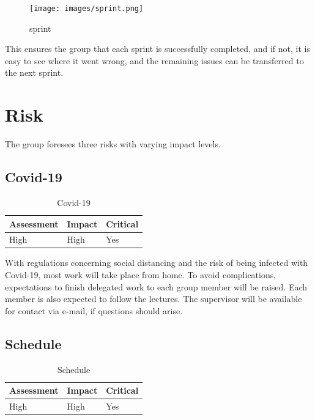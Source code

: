\begin{figure}[H]
\centering 
\texttt{[image: images/sprint.png]}
\label{figure:sprint}
\caption{sprint} 
\end{figure}

This ensures the group that each sprint is successfully completed, and if not,
it is easy to see where it went wrong, and the remaining issues can be
transferred to the next sprint.

\section{Risk}
The group foresees three risks with varying impact levels.

\subsection{Covid-19}
\begin{table}[ht]
    \begin{tabularx}{\textwidth}{|>{\RaggedRight}X|>{\RaggedRight}X|>{\RaggedRight}X|}
        \hline
        \textbf{Assessment} & \textbf{Impact} & \textbf{Critical} \\
        \hline
        High & High & Yes \\
        \hline
    \end{tabularx}
    \caption{Covid-19} 
    \label{table:Covid-19}
\end{table} 


With regulations concerning social distancing and the risk of being infected
with Covid-19, most work will take place from home. To avoid complications,
expectations to finish delegated work to each group member will be raised. Each
member is also expected to follow the lectures. The supervisor will be available
for contact via e-mail, if questions should arise.

\subsection{Schedule}
\begin{table}[ht]
    \begin{tabularx}{\textwidth}{|>{\RaggedRight}X|>{\RaggedRight}X|>{\RaggedRight}X|}
        \hline
        \textbf{Assessment} & \textbf{Impact} & \textbf{Critical} \\
        \hline
        High & High & Yes \\
        \hline
    \end{tabularx}
    \caption{Schedule} 
    \label{table:Schedule}
\end{table} 

